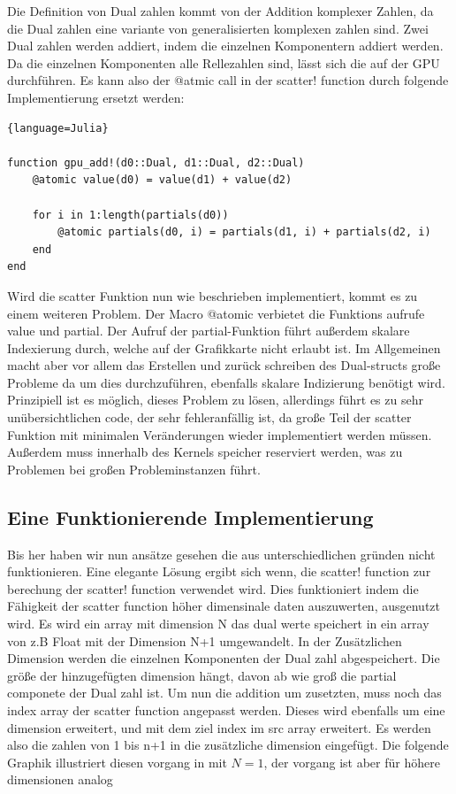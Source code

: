 Die Definition von Dual zahlen kommt von der Addition komplexer Zahlen, 
da die Dual zahlen eine variante von generalisierten komplexen zahlen sind.
Zwei Dual zahlen werden addiert, indem die einzelnen Komponentern addiert werden.
Da die einzelnen Komponenten  alle Rellezahlen sind, lässt sich die auf der GPU durchführen.
Es kann also der @atmic call in der scatter! function durch folgende Implementierung ersetzt werden:

\begin{lstlisting}{language=Julia}

function gpu_add!(d0::Dual, d1::Dual, d2::Dual)
	@atomic value(d0) = value(d1) + value(d2)
	
	for i in 1:length(partials(d0))
		@atomic partials(d0, i) = partials(d1, i) + partials(d2, i)
	end
end

\end{lstlisting}

Wird die scatter Funktion nun wie beschrieben implementiert, kommt es zu einem weiteren Problem.
Der Macro @atomic verbietet die Funktions aufrufe value und partial.
Der Aufruf der partial-Funktion führt außerdem skalare Indexierung durch, welche auf der Grafikkarte nicht erlaubt ist.
Im Allgemeinen macht aber vor allem das Erstellen und zurück schreiben des Dual-structs große Probleme
da um dies durchzuführen, ebenfalls skalare Indizierung benötigt wird.
Prinzipiell ist es möglich, dieses Problem zu lösen, 
allerdings führt es zu sehr unübersichtlichen code, der sehr fehleranfällig ist, 
da große Teil der scatter Funktion mit minimalen Veränderungen wieder implementiert werden müssen.
Außerdem muss innerhalb des Kernels speicher reserviert werden, was zu Problemen bei großen Probleminstanzen führt.

\subsection{Eine Funktionierende Implementierung}

Bis her haben wir nun ansätze gesehen die aus unterschiedlichen gründen nicht funktionieren.
Eine elegante Lösung ergibt sich wenn, 
die scatter! function zur berechung der scatter! function verwendet wird.
Dies funktioniert indem die Fähigkeit der scatter function höher dimensinale daten auszuwerten, ausgenutzt wird. 
Es wird ein array mit dimension N das dual werte speichert in ein array von z.B Float mit der Dimension N+1 umgewandelt. 
In der Zusätzlichen Dimension werden die einzelnen Komponenten der Dual zahl abgespeichert.
Die größe der hinzugefügten dimension hängt, davon ab wie groß die partial componete der Dual zahl ist.
Um nun die addition um zusetzten, muss noch das index array der scatter function angepasst werden.
Dieses wird ebenfalls um eine dimension erweitert, und mit dem ziel index im src array erweitert.
Es werden also die zahlen von 1 bis n+1 in die zusätzliche dimension eingefügt.
Die folgende Graphik illustriert diesen vorgang in mit $N = 1$, der vorgang ist aber für höhere dimensionen analog


